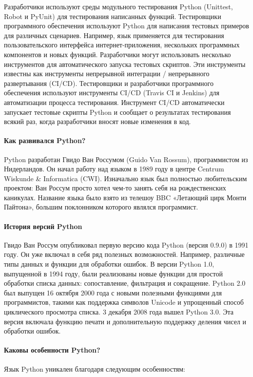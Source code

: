 Разработчики используют среды модульного тестирования Python (Unittest, Robot и PyUnit) для тестирования написанных функций. 
Тестировщики программного обеспечения используют Python для написания тестовых примеров для различных сценариев. Например, язык применяется для тестирования пользовательского интерфейса интернет-приложения, нескольких программных компонентов и новых функций. 
Разработчики могут использовать несколько инструментов для автоматического запуска тестовых скриптов. Эти инструменты известны как инструменты непрерывной интеграции / непрерывного развертывания (CI/CD). Тестировщики и разработчики программного обеспечения используют инструменты CI/CD (Travis CI и Jenkins) для автоматизации процесса тестирования. Инструмент CI/CD автоматически запускает тестовые скрипты Python и сообщает о результатах тестирования всякий раз, когда разработчики вносят новые изменения в код.

\paragraph{Как развивался Python?}
Python разработан Гвидо Ван Россумом (Guido Van Rossum), программистом из Нидерландов. Он начал работу над языком в 1989 году в центре Centrum Wiskunde \& Informatica (CWI). Изначально язык был полностью любительским проектом: Ван Россум просто хотел чем-то занять себя на рождественских каникулах. Название языка было взято из телешоу BBC «Летающий цирк Монти Пайтона», большим поклонником которого являлся программист. 

\paragraph{История версий Python}
Гвидо Ван Россум опубликовал первую версию кода Python (версия 0.9.0) в 1991 году. Он уже включал в себя ряд полезных возможностей. Например, различные типы данных и функции для обработки ошибок. 
В версии Python 1.0, выпущенной в 1994 году, были реализованы новые функции для простой обработки списка данных: сопоставление, фильтрация и сокращение.
Python 2.0 был выпущен 16 октября 2000 года с новыми полезными функциями для программистов, такими как поддержка символов Unicode и упрощенный способ циклического просмотра списка.
3 декабря 2008 года вышел Python 3.0. Эта версия включала функцию печати и дополнительную поддержку деления чисел и обработки ошибок. 
\paragraph{Каковы особенности Python?}
Язык Python уникален благодаря следующим особенностям:

